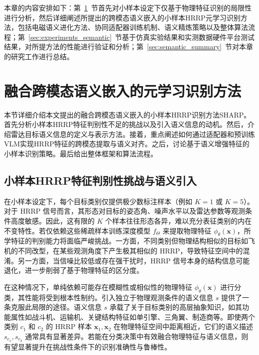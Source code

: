 本章的内容安排如下：第~\ref{sec:semantic_method}~节首先对小样本设定下仅基于物理特征识别的局限性进行分析，然后详细阐述所提出的跨模态语义嵌入的小样本HRRP元学习识别方法，包括电磁语义进化方法、协同适配器训练机制、语义精炼策略以及整体算法流程；第~\ref{sec:experiments_semantic}~节基于仿真实验结果和实测数据硬件平台测试结果，对所提方法的性能进行验证和分析；第~\ref{sec:semantic_summary}~节对本章的研究工作进行总结。

\section{融合跨模态语义嵌入的元学习识别方法}
\label{sec:semantic_method}

本节详细介绍本文提出的融合跨模态语义嵌入的小样本HRRP识别方法SHARP。首先分析小样本HRRP特征判别性不足的挑战以及引入语义信息的动机。然后，介绍雷达目标语义信息的定义与表示方法。接着，重点阐述如何通过适配器和预训练VLM实现HRRP特征的跨模态提取与语义对齐。之后，讨论基于语义增强特征的小样本识别策略。最后给出整体框架和算法流程。

\subsection{小样本HRRP特征判别性挑战与语义引入}
\label{subsec:semantic_challenge}

在小样本设定下，每个目标类别仅提供极少数标注样本（例如 $K=1$ 或 $K=5$）。对于 HRRP 信号而言，其形态对目标的姿态角、噪声水平以及雷达参数等观测条件高度敏感。因此，这有限的 $K$ 个样本往往形态各异，难以充分表征类别的内在不变特性。若仅依赖这些稀疏样本训练深度模型 $f_\Theta$ 来提取物理特征 $\phi_\theta(\mathbf{x})$，所学特征的判别能力将面临严峻挑战。一方面，不同类别但物理结构相似的目标如飞机的不同改型，在某些观测角度下产生极其相似的 HRRP，导致特征空间中的混淆。另一方面，当信噪比较低或存在强干扰时，HRRP 信号本身的结构信息可能退化，进一步削弱了基于物理特征的区分度。

在这种情况下，单纯依赖可能存在模糊性或相似性的物理特征 $\phi_\theta(\mathbf{x})$ 进行分类，其性能将受到根本性制约。引入独立于物理观测条件的语义信息 $s$ 提供了一条克服此局限的途径。语义信息 $s$ 承载了关于目标类别的高层抽象知识，如其功能属性如战斗机、运输机、关键结构特征如单引擎、三角翼、制造商等。即使两个类别 $c_1$ 和 $c_2$ 的 HRRP 样本 $\mathbf{x}_1, \mathbf{x}_2$ 在物理特征空间中距离相近，它们的语义描述 $s_{c_1}, s_{c_2}$ 通常具有显著差异。若能在分类决策中有效融合物理特征与语义信息，则有望显著提升在挑战性条件下的识别准确性与鲁棒性。

